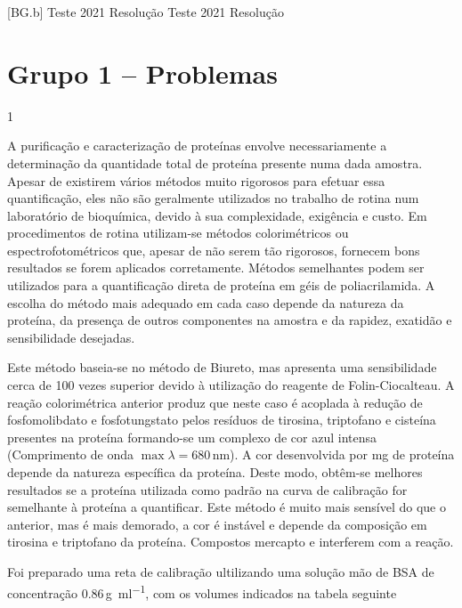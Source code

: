 \documentclass[\mainfilename]{subfiles}
\begin{document}
[BG.b]
{Teste 2021 Resolução}
{Teste 2021 Resolução}

\part*{Grupo 1 -- Problemas}
\setcounter{question}{0}

\begin{questionBox}1{}
    
    A purificação e caracterização de proteínas envolve necessariamente a determinação da quantidade total de proteína presente numa dada amostra. Apesar de existirem vários métodos muito rigorosos para efetuar essa quantificação, eles não são geralmente utilizados no trabalho de rotina num laboratório de bioquímica, devido à sua complexidade, exigência e custo. Em procedimentos de rotina utilizam-se métodos colorimétricos ou espectrofotométricos que, apesar de não serem tão rigorosos, fornecem bons resultados se forem aplicados corretamente. Métodos semelhantes podem ser utilizados para a quantificação direta de proteína em géis de poliacrilamida. A escolha do método mais adequado em cada caso depende da natureza da proteína, da presença de outros componentes na amostra e da rapidez, exatidão e sensibilidade desejadas.
    
    Este método baseia-se no método de Biureto, mas apresenta uma sensibilidade cerca de 100 vezes superior devido à utilização do reagente de Folin-Ciocalteau. A reação colorimétrica anterior produz  que neste caso é acoplada à redução de fosfomolibdato e fosfotungstato pelos resíduos de tirosina, triptofano e cisteína presentes na proteína formando-se um complexo de cor azul intensa (Comprimento de onda \(\max\lambda=680\,\unit{\nano\metre}\)). A cor desenvolvida por \unit{\milli\gram} de proteína depende da natureza específica da proteína. Deste modo, obtêm-se melhores resultados se a proteína utilizada como padrão na curva de calibração for semelhante à proteína a quantificar. Este método é muito mais sensível do que o anterior, mas é mais demorado, a cor é instável e depende da composição em tirosina e triptofano da proteína. Compostos mercapto e  interferem com a reação.

    Foi preparado uma reta de calibração ultilizando uma solução mão de BSA de concentração 0.86\,\unit{\gram\per\milli\litre}, com os volumes indicados na tabela seguinte

    \begin{center}
        \begin{tabular}{c *{3}{r}}
            

\end{tabular}
\end{center}
\end{questionBox}
\end{document}
